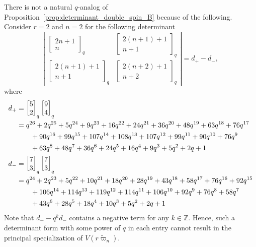 \documentclass[11pt, leqno]{amsart}
\theoremstyle{plain}
\theoremstyle{definition}
\numberwithin{equation}{section}
\newcommand{\fw}{\varpi} %
\newcommand{\tfw}{\widetilde{\fw}} %
\newcommand{\qbinom}[3]{\left[ \begin{matrix} #1 \\ #2 \end{matrix} \right]_{#3}} %
\newcommand{\Z}{\mathbb{Z}}
\begin{document}

There is not a natural $q$-analog of Proposition~\ref{prop:determinant_double_spin_B} because of the following. Consider $r = 2$ and $n = 2$ for the following determinant
\[
\left\lvert \begin{matrix}
\qbinom{2n+1}{n}{q} & \qbinom{2(n+1)+1}{n+1}{q} \\
\qbinom{2(n+1)+1}{n+1}{q} & \qbinom{2(n+2)+1}{n+2}{q}
\end{matrix} \right\rvert
= d_+ - d_-,
\]
where
\begin{align*}
d_+ & = \qbinom{5}{2}{q} \qbinom{9}{4}{q}
\\ & = q^{26} + 2q^{25} + 5q^{24} + 9q^{23} + 16q^{22} + 24q^{21} + 36q^{20} + 48q^{19} + 63q^{18} + 76q^{17}
\\ & \hspace{20pt} + 90q^{16} + 99q^{15} + 107q^{14} + 108q^{13} + 107q^{12} + 99q^{11} + 90q^{10} + 76q^{9}
\\ & \hspace{20pt} + 63q^{8} + 48q^{7} + 36q^{6} + 24q^{5} + 16q^{4} + 9q^{3} + 5q^{2} + 2q + 1 \allowdisplaybreaks \\
d_-  & = \qbinom{7}{3}{q} \qbinom{7}{3}{q}
\\ & = q^{24} + 2q^{23} + 5q^{22} + 10q^{21} + 18q^{20} + 28q^{19} + 43q^{18} + 58q^{17} + 76q^{16} + 92q^{15}
\\ & \hspace{20pt} + 106q^{14} + 114q^{13} + 119q^{12} + 114q^{11} + 106q^{10} + 92q^{9} + 76q^{8} + 58q^{7}
\\ & \hspace{20pt} + 43q^{6} + 28q^{5} + 18q^{4} + 10q^{3} + 5q^{2} + 2q + 1
\end{align*}
Note that $d_+ - q^k d_-$ contains a negative term for any $k \in \Z$. Hence, such a determinant form with some power of $q$ in each entry cannot result in the principal specialization of $V(r \tfw_n)$.
\end{document}
